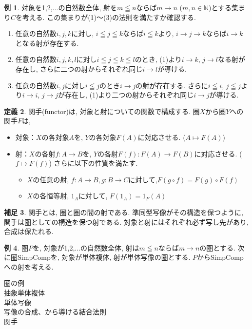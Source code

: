 \documentclass{article}
\theoremstyle{definition}
\newtheorem{dfn}{定義}[section]
\newtheorem{exam}[dfn]{例}
\newtheorem{hsk}[dfn]{補足}
\newcommand{\SimpComp}{{\mathrm{SimpComp}}}
\begin{document}
\begin{exam}
対象を1,2,...の自然数全体, 射を$m\leqq n$ならば$m \rightarrow n$ ($m, n \in \mathbb{N}$)とする集まり$C$を考える. この集まりが(1)～(3)の法則を満たすか確認する. 
 \begin{enumerate}[(1)]
        \item 任意の自然数$i, j, k$に対し, $i\leqq j\leqq k$ならば$i\leqq k$より, $i\rightarrow j\rightarrow k$ならば$i\rightarrow k$となる射が存在する.
        \item 任意の自然数$i, j, k, l$に対し$i\leqq j\leqq k\leqq l$のとき, (1)より$i\rightarrow k$, $j \rightarrow l$なる射が存在し, さらに二つの射からそれぞれ同じ$i\rightarrow l$が導ける.
        \item 任意の自然数$i, j$に対し$i\leqq j$のとき$i\rightarrow j$の射が存在する. さらに$i\leqq i$, $j\leqq j$より$i\rightarrow i$, $j\rightarrow j$が存在し, (1)より二つの射からそれぞれ同じ$i\rightarrow j$が導ける.\\
\end{enumerate}
\end{exam}

\begin{dfn}
    関手(functor)は, 対象と射についての関数で構成する. 圏$X$から圏$Y$への関手$F$は,
    \begin{itemize}
        \item 対象：$X$の各対象$A$を, $Y$の各対象$F(A)$に対応させる. ($A\longmapsto F(A)$)
        \item 射：$X$の各射$f:A\rightarrow B$を, $Y$の各射$F(f): F(A)\rightarrow F(B)$に対応させる. ($f\longmapsto F(f)$) さらに以下の性質を満たす.
        \begin{itemize}
            \item[\labelitemi] $X$の任意の射, $f:A\rightarrow B, g:B\rightarrow C$に対して,$F(g\circ f) = F(g)\circ F(f)$
            \item[\labelitemi] $X$の各恒等射, $1_A$に対して, $F(1_A) = 1_F(A)$\\
        \end{itemize}
    \end{itemize}
\end{dfn}
\begin{hsk}
    関手とは, 圏と圏の間の射である. 準同型写像がその構造を保つように, 関手は圏としての構造を保つ射である. 対象と射にはそれぞれ必ず写し先があり, 合成は保たれる.\\
\end{hsk}
\begin{exam}
    圏$P$を, 対象が1,2,...の自然数全体, 射は$m\leqq n$ならば$m \rightarrow n$の圏とする. 次に圏$\SimpComp$を, 対象が単体複体, 射が単体写像の圏とする. $P$からSimpCompへの射を考える.
\end{exam}
圏の例\\
抽象単体複体\\
単体写像\\
写像の合成、から導ける結合法則\\
関手\\
\end{document}
